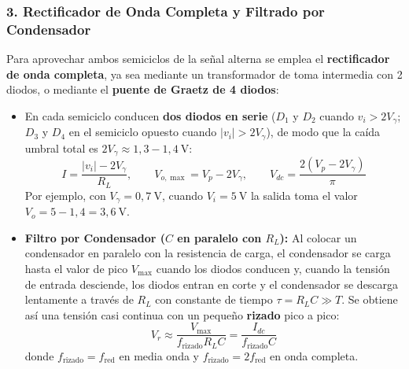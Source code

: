\subsubsection{3. Rectificador de Onda Completa y Filtrado por Condensador}
Para aprovechar ambos semiciclos de la señal alterna se emplea el \textbf{rectificador de onda completa}, ya sea mediante un transformador de toma intermedia con 2 diodos, o mediante el \textbf{puente de Graetz de 4 diodos}:
\begin{itemize}[leftmargin=*]
    \item En cada semiciclo conducen \textbf{dos diodos en serie} ($D_1$ y $D_2$ cuando $v_i > 2V_\gamma$; $D_3$ y $D_4$ en el semiciclo opuesto cuando $|v_i| > 2V_\gamma$), de modo que la caída umbral total es $2V_\gamma \approx 1{,}3 - 1{,}4\ \si{\volt}$:
    \begin{equation}
        I = \frac{|v_i| - 2V_\gamma}{R_L}, \qquad V_{o,\max} = V_p - 2V_\gamma, \qquad V_{dc} = \frac{2(V_p - 2V_\gamma)}{\pi}
    \end{equation}
    Por ejemplo, con $V_\gamma = 0{,}7\ \si{\volt}$, cuando $V_i = 5\ \si{\volt}$ la salida toma el valor $V_o = 5 - 1{,}4 = 3{,}6\ \si{\volt}$.
    \item \textbf{Filtro por Condensador ($C$ en paralelo con $R_L$):} Al colocar un condensador en paralelo con la resistencia de carga, el condensador se carga hasta el valor de pico $V_{\max}$ cuando los diodos conducen y, cuando la tensión de entrada desciende, los diodos entran en corte y el condensador se descarga lentamente a través de $R_L$ con constante de tiempo $\tau = R_L C \gg T$. Se obtiene así una tensión casi continua con un pequeño \textbf{rizado} pico a pico:
    \begin{equation}
        V_r \approx \frac{V_{\max}}{f_{\text{rizado}} R_L C} = \frac{I_{dc}}{f_{\text{rizado}} C}
    \end{equation}
    donde $f_{\text{rizado}} = f_{\text{red}}$ en media onda y $f_{\text{rizado}} = 2 f_{\text{red}}$ en onda completa.
\end{itemize}

\begin{center}
\end{center}

